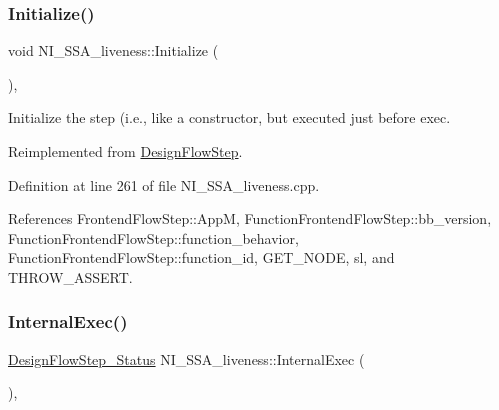 \mbox{\label{classNI__SSA__liveness_acc878d0cb85006c946feebb6c43e474e}} 
\subsubsection{\texorpdfstring{Initialize()}{Initialize()}}
{\footnotesize\ttfamily void N\+I\+\_\+\+S\+S\+A\+\_\+liveness\+::\+Initialize (\begin{DoxyParamCaption}{ }\end{DoxyParamCaption})\hspace{0.3cm}{\ttfamily [override]}, {\ttfamily [virtual]}}



Initialize the step (i.\+e., like a constructor, but executed just before exec. 



Reimplemented from \hyperlink{classDesignFlowStep_a44b50683382a094976e1d432a7784799}{Design\+Flow\+Step}.



Definition at line 261 of file N\+I\+\_\+\+S\+S\+A\+\_\+liveness.\+cpp.



References Frontend\+Flow\+Step\+::\+AppM, Function\+Frontend\+Flow\+Step\+::bb\+\_\+version, Function\+Frontend\+Flow\+Step\+::function\+\_\+behavior, Function\+Frontend\+Flow\+Step\+::function\+\_\+id, G\+E\+T\+\_\+\+N\+O\+DE, sl, and T\+H\+R\+O\+W\+\_\+\+A\+S\+S\+E\+RT.

\mbox{\label{classNI__SSA__liveness_aecf212baba3490d67930ead02c27dfc7}} 
\subsubsection{\texorpdfstring{Internal\+Exec()}{InternalExec()}}
{\footnotesize\ttfamily \hyperlink{design__flow__step_8hpp_afb1f0d73069c26076b8d31dbc8ebecdf}{Design\+Flow\+Step\+\_\+\+Status} N\+I\+\_\+\+S\+S\+A\+\_\+liveness\+::\+Internal\+Exec (\begin{DoxyParamCaption}{ }\end{DoxyParamCaption})\hspace{0.3cm}{\ttfamily [override]}, {\ttfamily [virtual]}}



